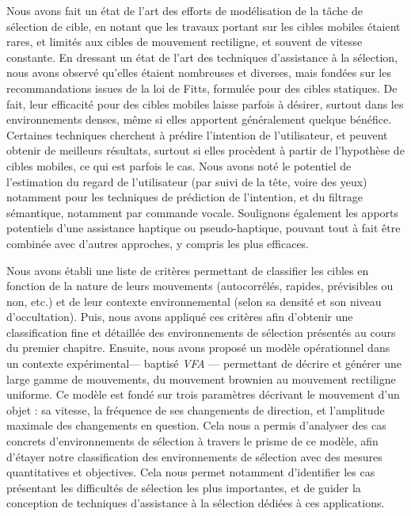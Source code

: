 	Nous avons fait un état de l'art des efforts de modélisation de la tâche de sélection de cible, en notant que les travaux portant sur les cibles mobiles étaient rares, et limités aux cibles de mouvement rectiligne, et souvent de vitesse constante. En dressant un état de l'art des techniques d'assistance à la sélection, nous avons observé qu'elles étaient nombreuses et diverses, mais fondées sur les recommandations issues de la loi de Fitts, formulée pour des cibles statiques. De fait, leur efficacité pour des cibles mobiles laisse parfois à désirer, surtout dans les environnements denses, même si elles apportent généralement quelque bénéfice. Certaines techniques cherchent à prédire l'intention de l'utilisateur, et peuvent obtenir de meilleurs résultats, surtout si elles procèdent à partir de l'hypothèse de cibles mobiles, ce qui est parfois le cas. Nous avons noté le potentiel de l'estimation du regard de l'utilisateur (par suivi de la tête, voire des yeux) notamment pour les techniques de prédiction de l'intention, et du filtrage sémantique, notamment par commande vocale. Soulignons également les apports potentiels d'une assistance haptique ou pseudo-haptique, pouvant tout à fait être combinée avec d'autres approches, y compris les plus efficaces.
	
	Nous avons établi une liste de critères permettant de classifier les cibles en fonction de la nature de leurs mouvements (autocorrélés, rapides, prévisibles ou non, etc.) et de leur contexte environnemental (selon sa densité et son niveau d'occultation). Puis, nous avons appliqué ces critères afin d'obtenir une classification fine et détaillée des environnements de sélection présentés au cours du premier chapitre. Ensuite, nous avons proposé un modèle opérationnel dans un contexte expérimental--- baptisé \emph{VFA} --- permettant de décrire et générer une large gamme de mouvements, du mouvement brownien au mouvement rectiligne uniforme. Ce modèle est fondé sur trois paramètres décrivant le mouvement d'un objet : sa vitesse, la fréquence de ses changements de direction, et l'amplitude maximale des changements en question. Cela nous a permis d'analyser des cas concrets d'environnements de sélection à travers le prisme de ce modèle, afin d'étayer notre classification des environnements de sélection avec des mesures quantitatives et objectives. Cela nous permet notamment d'identifier les cas présentant les difficultés de sélection les plus importantes, et de guider la conception de techniques d'assistance à la sélection dédiées à ces applications.
	
